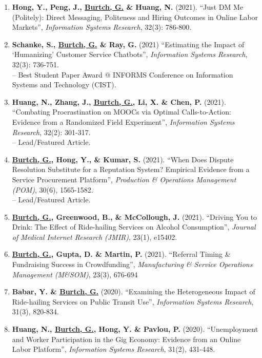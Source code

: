 \documentclass[10.5pt,letterpaper,sans]{moderncv}        %
\begin{document}
\begin{enumerate}[leftmargin=!,labelindent=5pt,itemindent=-15pt]
\item \textbf{Hong, Y., Peng, J., \underline{Burtch, G.} \& Huang, N.} (2021). ``Just DM Me (Politely): Direct Messaging, Politeness and Hiring Outcomes in Online Labor Markets'', \textit{Information Systems Research}, 32(3): 786-800.

\item \textbf{Schanke, S., \underline{Burtch, G.} \& Ray, G.} (2021) ``Estimating the Impact of `Humanizing' Customer Service Chatbots'', \textit{Information Systems Research}, 32(3): 736-751. \\-- Best Student Paper Award @ INFORMS Conference on Information Systems and Technology (CIST).

\item \textbf{Huang, N., Zhang, J., \underline{Burtch, G.}, Li, X. \& Chen, P.} (2021). ``Combating Procrastination on MOOCs via Optimal Calls-to-Action: Evidence from a Randomized Field Experiment'', \textit{Information Systems Research},  32(2): 301-317. \\-- Lead/Featured Article.

\item \textbf{\underline{Burtch, G.}, Hong, Y., \& Kumar, S.} (2021). ``When Does Dispute Resolution Substitute for a Reputation System? Empirical Evidence from a Service Procurement Platform'', \textit{Production \& Operations Management (POM)}, 30(6), 1565-1582.\\-- Lead/Featured Article.

\item \textbf{\underline{Burtch, G.}, Greenwood, B., \& McCollough, J.} (2021). ``Driving You to Drink: The Effect of Ride-hailing Services on Alcohol Consumption'', \textit{Journal of Medical Internet Research (JMIR)}, 23(1), e15402.

\item \textbf{\underline{Burtch, G.}, Gupta, D. \& Martin, P.} (2021). ``Referral Timing \& Fundraising Success in Crowdfunding'', \textit{Manufacturing \& Service Operations Management (M\&SOM)}, 23(3), 676-694

\item \textbf{Babar, Y. \& \underline{Burtch, G.}} (2020). ``Examining the Heterogeneous Impact of Ride-hailing Services on Public Transit Use'', \textit{Information Systems Research}, 31(3), 820-834.

\item \textbf{Huang, N., \underline{Burtch, G.}, Hong, Y. \& Pavlou, P.} (2020). ``Unemployment and Worker Participation in the Gig Economy: Evidence from an Online Labor Platform'', \textit{Information Systems Research}, 31(2), 431-448.


\end{enumerate}
\end{document}
